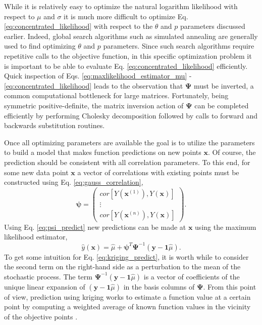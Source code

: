 While it is relatively easy to optimize the natural logarithm likelihood with respect to $\mu$ and $\sigma$ it is much more difficult to optimize Eq. \ref{eq:concentrated_likelihood} with respect to the $\theta$ and $p$ parameters discussed earlier. Indeed, global search algorithms such as simulated annealing \cite{Kirkpatrick} are generally used to find optimizing $\theta$ and $p$ parameters. Since such search algorithms require repetitive calls to the objective function, in this specific optimization problem it is important to be able to evaluate Eq. \ref{eq:concentrated_likelihood} efficiently. Quick inspection of Eqs. \ref{eq:maxlikelihood_estimator_mu} - \ref{eq:concentrated_likelihood} leads to the observation that $\boldsymbol{\Psi}$ must be inverted, a common computational bottleneck for large matrices. Fortunately, being symmetric positive-definite, the matrix inversion action of $\boldsymbol{\Psi}$ can be completed efficiently by performing Cholesky decomposition followed by calls to forward and backwards substitution routines.      

Once all optimizing parameters are available the goal is to utilize the parameters to build a model that makes function predictions on new points $\textbf{x}$. Of course, the prediction should be consistent with all correlation parameters. To this end, for some new data point $\textbf{x}$ a vector of correlations with existing points must be constructed using Eq. \ref{eq:gauss_correlation},
\begin{equation}
\label{eq:psi_predict}
 \boldsymbol{\psi} =
 \begin{pmatrix} 
	cor[Y(\textbf{x}^{(1)}), Y(\textbf{x})] \\
	\vdots \\ 
	cor[Y(\textbf{x}^{(n)}), Y(\textbf{x})] 
 \end{pmatrix}.
\end{equation} 
Using Eq. \ref{eq:psi_predict} new predictions can be made at $\textbf{x}$ using the maximum likelihood estimator,
\begin{equation}
\label{eq:kriging_predict}
   \hat{y}(\textbf{x}) = \hat{\mu} + 
   		\boldsymbol{\psi}^T\boldsymbol{\Psi}^{-1}
   		 \left(\textbf{y} - \textbf{1}\hat{\mu}\right).
\end{equation}
To get some intuition for Eq. \ref{eq:kriging_predict}, it is worth while to consider the second term on the right-hand side as a perturbation to the mean of the stochastic process. The term $\boldsymbol{\Psi}^{-1}\left(\textbf{y} - \textbf{1}\hat{\mu}\right)$ is a vector of coefficients of the unique linear expansion of $\left(\textbf{y} - \textbf{1}\hat{\mu}\right)$ in the basis columns of $\boldsymbol{\Psi}$. From this point of view, prediction using kriging works to estimate a function value at a certain point by computing a weighted average of known function values in the vicinity of the objective points \cite{Isaaks}. 


 

